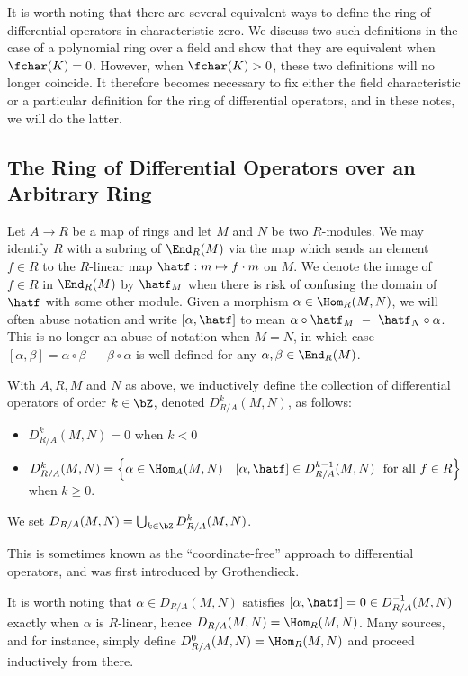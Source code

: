 It is worth noting that there are several equivalent ways to define the ring of differential operators in characteristic zero. We discuss two such definitions in the case of a polynomial ring over a field and show that they are equivalent when $\fchar(K) = 0$. However, when $\fchar(K) > 0$, these two definitions will no longer coincide. It therefore becomes necessary to fix either the field characteristic or a particular definition for the ring of differential operators, and in these notes, we will do the latter.

\subsection{The Ring of Differential Operators over an Arbitrary Ring}\label{sec:general-diff-ops}
Let $A\to R$ be a map of rings and let $M$ and $N$ be two $R$-modules. We may identify $R$ with a subring of $\End_R(M)$ via the map which sends an element $f \in R$ to the $R$-linear map $\hatf:m\mapsto f\cdot m$ on $M$. We denote the image of $f \in R$ in $\End_R(M)$ by $\hatf_M$ when there is risk of confusing the domain of $\hatf$ with some other module. Given a morphism $\alpha \in \Hom_R(M,N)$, we will often abuse notation and write $[\alpha, \hatf]$ to mean $\alpha \circ \hatf_M ~-~ \hatf_N\circ \alpha$. This is no longer an abuse of notation when $M = N$, in which case $[\alpha,\beta] = \alpha \circ \beta ~-~ \beta\circ\alpha$ is well-defined for any $\alpha, \beta \in \End_R(M)$.

\begin{defn}\label{defn:diff-ops}
	With $A,R,M$ and $N$ as above, we inductively define the collection of differential operators of order $k \in \bZ$, denoted $D^k_{R/A}(M,N)$, as follows:
	\begin{itemize}
		\item $D^k_{R/A}(M,N) = 0$ when $k < 0$
		\item $D^k_{R/A}(M,N) = \left\{\alpha \in \Hom_A(M,N) ~\middle|~ \left[\alpha,\hatf\right] \in D^{k-1}_{R/A}(M,N) ~ \text{ for all } f\in R\right\} $ when $k \geq 0$.
	\end{itemize}
	We set $D_{R/A}(M,N) = \bigcup_{k\in \bZ} D^k_{R/A}(M,N)$.
\end{defn}
This is sometimes known as the ``coordinate-free'' approach to differential operators, and was first introduced by Grothendieck.
\begin{rmk}\label{rmk:starting-index-of-diff-op-def}
	It is worth noting that $\alpha \in D_{R/A}(M,N)$ satisfies $[\alpha,\hatf] = 0 \in D^{-1}_{R/A}(M,N)$ exactly when $\alpha$ is $R$-linear, hence $D_{R/A}(M,N) = \Hom_R(M,N)$. Many sources, \cite{ginzburg_d-mod} and \cite{bernstein_d-mod} for instance, simply define $D^0_{R/A}(M,N) = \Hom_{R}(M,N)$ and proceed inductively from there.
\end{rmk}

